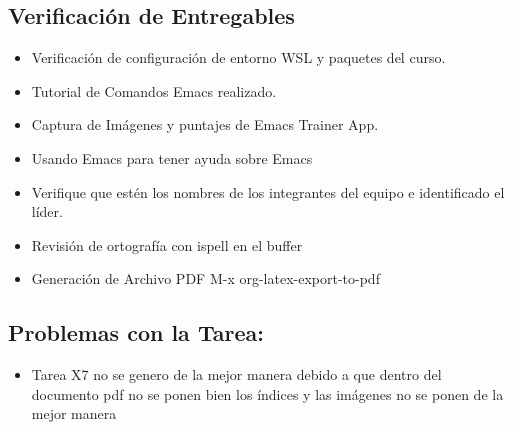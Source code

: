 \documentclass[11pt]{article}
\begin{document}
\subsection{Verificación de Entregables}
\label{sec:org123f03c}
\begin{itemize}
\item[{$\boxtimes$}] Verificación de configuración de entorno WSL y paquetes del curso.
\item[{$\boxtimes$}] Tutorial de Comandos Emacs realizado.
\item[{$\boxtimes$}] Captura de Imágenes y puntajes de Emacs Trainer App.
\item[{$\boxtimes$}] Usando Emacs para tener ayuda sobre Emacs
\item[{$\boxtimes$}] Verifique que estén los nombres de los integrantes del equipo e identificado el líder.
\item[{$\boxtimes$}] Revisión de ortografía con ispell en el buffer
\item[{$\boxtimes$}] Generación de Archivo PDF M-x org-latex-export-to-pdf
\end{itemize}

\subsection{Problemas con la Tarea:}
\label{sec:org1de9aea}
\begin{itemize}
\item Tarea X7 no se genero de la mejor manera debido a que dentro del documento pdf no se ponen bien los índices y las imágenes no se ponen de la mejor manera
\end{itemize}
\end{document}

